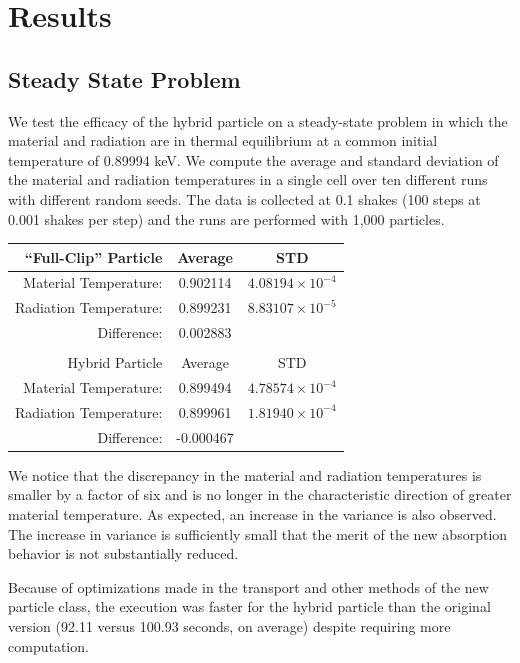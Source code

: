 \documentclass[11pt]{nmemo}
\begin{document}
\section{Results}

\subsection{Steady State Problem}

We test the efficacy of the hybrid particle on a steady-state problem
in which the material and radiation are in thermal equilibrium at a
common initial temperature of 0.89994 keV. We compute the average and
standard deviation of the material and radiation temperatures in a
single cell over ten different runs with different random seeds. The
data is collected at 0.1 shakes (100 steps at 0.001 shakes per step)
and the runs are performed with 1,000 particles.

\begin{center}
  \begin{tabular}{r|cc}
    ``Full-Clip'' Particle  &  Average   & STD \\ \hline
     Material Temperature:  &  0.902114  & $4.08194\times 10^{-4}$ \\
     Radiation Temperature: &  0.899231  & $8.83107\times 10^{-5}$ \\
     Difference:            &  0.002883  & \\
     \multicolumn{3}{c}{} \\
     Hybrid Particle        &  Average   & STD \\ \hline
     Material Temperature:  &  0.899494  & $4.78574\times 10^{-4}$ \\
     Radiation Temperature: &  0.899961  & $1.81940\times 10^{-4}$ \\
     Difference:            & -0.000467  & \\
  \end{tabular}
\end{center}

We notice that the discrepancy in the material and radiation
temperatures is smaller by a factor of six and is no longer in the
characteristic direction of greater material temperature. As expected,
an increase in the variance is also observed. The increase in variance
is sufficiently small that the merit of the new absorption behavior is
not substantially reduced.  

Because of optimizations made in the transport and other methods of
the new particle class, the execution was faster for the hybrid
particle than the original version (92.11 versus 100.93 seconds, on
average) despite requiring more computation.
\end{document}
